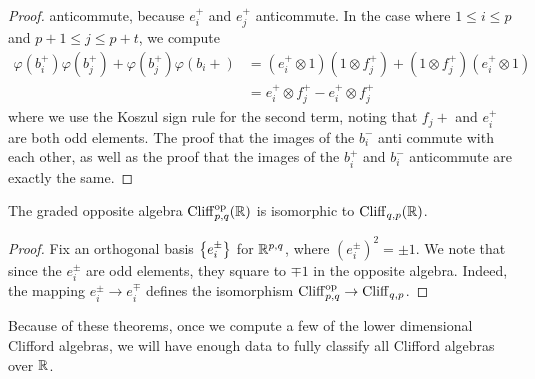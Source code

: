 \begin{proof}
anticommute, because $e_i^+$ and $e_j^+$ anticommute. In the case where
$1 \leq i \leq p$ and $p+1 \leq j \leq p+t$, we compute
%
\begin{align*}
\varphi(b_i^+)\varphi(b_j^+) + \varphi(b_j^+)\varphi(b_i+) & =
(e_i^+ \otimes 1)(1 \otimes f_j^+) + (1\otimes f_j^+)(e_i^+ \otimes 1) \\
                                                           & = e_i^+ \otimes f_j^+ - e_i^+ \otimes f_j^+
\end{align*}
where we use the Koszul sign rule for the second term, noting that $f_j+$ and
$e_i^+$ are both odd elements. The proof that the images of the $b_i^-$ anti commute with
each other, as well as the proof that the images of the $b_i^+$ and $b_i^-$
anticommute are exactly the same.
%
\end{proof}
%
\begin{thm}
The graded opposite algebra $\operatorname{Cliff}_{p,q}^{\text{op}}(\mathbb{R})$ is isomorphic to
$\operatorname{Cliff}_{q,p}(\mathbb{R})$.
\end{thm}
%
\begin{proof}
Fix an orthogonal basis $\left\lbrace e_i^\pm \right\rbrace$ for $\mathbb{R}^{p,q}$, where
$(e_i^\pm)^2 = \pm 1$. We note that since the $e_i^\pm$ are odd elements,
they square to $\mp 1$ in the opposite algebra. Indeed, the mapping
$e_i^\pm \to e_i^\mp$ defines the isomorphism
$\operatorname{Cliff}_{p,q}^\text{op} \to \operatorname{Cliff}_{q,p}$.
\end{proof}
%
Because of these theorems, once we compute a few of the lower dimensional
Clifford algebras, we will have enough data to fully classify all Clifford
algebras over $\mathbb{R}$.
%
